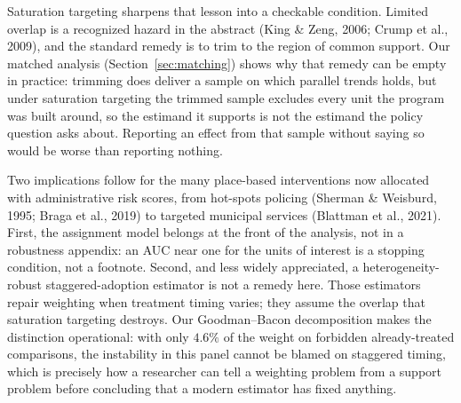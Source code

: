 \documentclass[12pt]{article}
\begin{document}
Saturation targeting sharpens that lesson into a checkable condition. Limited overlap is a
recognized hazard in the abstract (King \& Zeng, 2006; Crump et al., 2009), and the standard
remedy is to trim to the region of common support. Our matched analysis
(Section~\ref{sec:matching}) shows why that remedy can be empty in practice: trimming does
deliver a sample on which parallel trends holds, but under saturation targeting the trimmed
sample excludes every unit the program was built around, so the estimand it supports is not
the estimand the policy question asks about. Reporting an effect from that sample without
saying so would be worse than reporting nothing.

Two implications follow for the many place-based interventions now allocated with
administrative risk scores, from hot-spots policing (Sherman \& Weisburd, 1995; Braga et
al., 2019) to targeted municipal services (Blattman et al., 2021). First, the assignment
model belongs at the front of the analysis, not in a robustness appendix: an AUC near one
for the units of interest is a stopping condition, not a footnote. Second, and less widely
appreciated, a heterogeneity-robust staggered-adoption estimator is not a remedy here.
Those estimators repair weighting when treatment timing varies; they assume the overlap
that saturation targeting destroys. Our Goodman--Bacon decomposition makes the distinction
operational: with only $4.6\%$ of the weight on forbidden already-treated comparisons, the
instability in this panel cannot be blamed on staggered timing, which is precisely how a
researcher can tell a weighting problem from a support problem before concluding that a
modern estimator has fixed anything.
\end{document}
